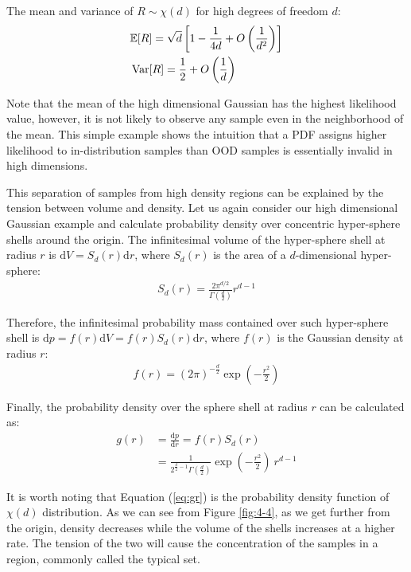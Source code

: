 \begin{remark}
The mean and variance of $R \sim \chi(d)$ for high degrees of freedom $d$:
\begin{align*}
    &\mathbb{E}[R] = \sqrt{d} \left[1-\frac{1}{4d}+O\left(\frac{1}{d^2}\right)\right] \\
    &\operatorname{Var}[R] = \frac{1}{2} + O\left(\frac{1}{d}\right)
\end{align*}
\end{remark}

Note that the mean of the high dimensional Gaussian has the highest likelihood value, however, it is not likely to observe any sample even in the neighborhood of the mean. This simple example shows the intuition that a PDF assigns higher likelihood to in-distribution samples than OOD samples is essentially invalid in high dimensions.

This separation of samples from high density regions can be explained by the tension between volume and density. Let us again consider our high dimensional Gaussian example and calculate probability density over concentric hyper-sphere shells around the origin. The infinitesimal volume of the hyper-sphere shell at radius $r$ is $\mathrm{d}V = S_{d}(r) \mathrm{d}r$, where $S_{d}(r)$ is the area of a $d$-dimensional hyper-sphere:
\begin{align}
    S_{d}(r) =  \frac{2 \pi^{d/2}}{\Gamma\left(\frac{d}{2}\right)} r^{d-1}
\end{align}

Therefore, the infinitesimal probability mass contained over such hyper-sphere shell is $ \mathrm{d}p = f(r) \mathrm{d}V = f(r) S_{d}(r) \mathrm{d}r$, where $f(r)$ is the Gaussian density at radius $r$: 
\begin{align}
    f(r) = (2\pi)^{-\frac{d}{2}}\exp(-\frac{r^2}{2})
\end{align}

Finally, the probability density over the sphere shell at radius $r$ can be calculated as:
\begin{align}
    g(r) &= \frac{\mathrm{d}p}{\mathrm{d}r} = f(r) S_{d}(r)  \nonumber \\
    &= \frac{1}{2^{\frac{d}{2}-1}\Gamma\left(\frac{d}{2}\right)} \exp(-\frac{r^2}{2}) \ r^{d-1} \label{eq:gr}
\end{align}

It is worth noting that Equation (\ref{eq:gr}) is the probability density function of $\chi(d)$ distribution. As we can see from Figure \ref{fig:4-4}, as we get further from the origin, density decreases while the volume of the shells increases at a higher rate. The tension of the two will cause the concentration of the samples in a region, commonly called the typical set.

